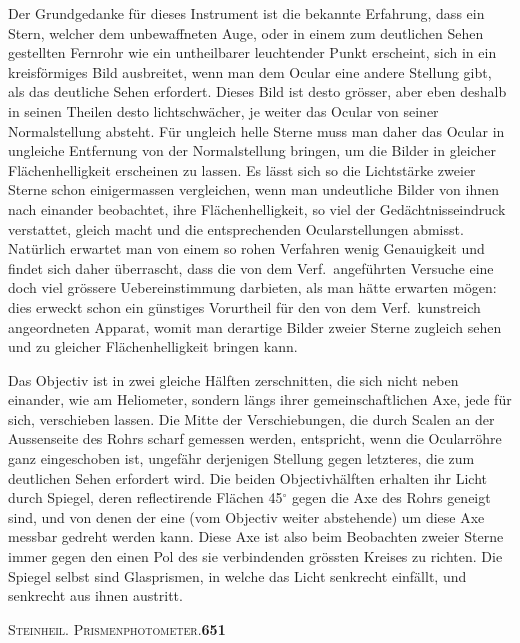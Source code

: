 \documentclass[12pt,a4paper]{article}
\begin{document}
Der Grundgedanke f\"ur dieses Instrument ist die bekannte Erfahrung, dass ein Stern, welcher dem unbewaffneten Auge, oder in einem zum deutlichen Sehen gestellten Fernrohr wie ein untheilbarer leuchtender Punkt erscheint, sich in ein kreisf\"ormiges Bild ausbreitet, wenn man dem Ocular eine andere Stellung gibt, als das deutliche Sehen erfordert. Dieses Bild ist desto gr\"osser, aber eben deshalb in seinen Theilen desto lichtschw\"acher, je weiter das Ocular von seiner Normalstellung absteht. F\"ur ungleich helle Sterne muss man daher das Ocular in ungleiche Entfernung von der Normalstellung bringen, um die Bilder in gleicher Fl\"achenhelligkeit erscheinen zu lassen. Es l\"asst sich so die Lichtst\"arke zweier Sterne schon einigermassen vergleichen, wenn man undeutliche Bilder von ihnen nach einander beobachtet, ihre Fl\"achenhelligkeit, so viel der Ged\"achtnisseindruck verstattet, gleich macht und die entsprechenden Ocularstellungen abmisst. Nat\"urlich erwartet man von einem so rohen Verfahren wenig Genauigkeit und findet sich daher \"uberrascht, dass die von dem Verf.\ angef\"uhrten Versuche eine doch viel gr\"ossere Uebereinstimmung darbieten, als man h\"atte erwarten m\"ogen: dies erweckt schon ein g\"unstiges Vorurtheil f\"ur den von dem Verf.\ kunstreich angeordneten Apparat, womit man derartige Bilder zweier Sterne zugleich sehen und zu gleicher Fl\"achenhelligkeit bringen kann.

Das Objectiv ist in zwei gleiche H\"alften zerschnitten, die sich nicht neben einander, wie am Heliometer, sondern l\"angs ihrer gemeinschaftlichen Axe, jede f\"ur sich, verschieben lassen. Die Mitte der Verschiebungen, die durch Scalen an der Aussenseite des Rohrs scharf gemessen werden, entspricht, wenn die Ocularr\"ohre ganz eingeschoben ist, ungef\"ahr derjenigen Stellung gegen letzteres, die zum deutlichen Sehen erfordert wird. Die beiden Objectivh\"alften erhalten ihr Licht durch Spiegel, deren reflectirende Fl\"achen 45$^{\circ}$ gegen die Axe des Rohrs geneigt sind, und von denen der eine (vom Objectiv weiter abstehende) um diese Axe messbar gedreht werden kann. Diese Axe ist also beim Beobachten zweier Sterne immer gegen den einen Pol des sie verbindenden gr\"ossten Kreises zu richten. Die Spiegel selbst sind Glasprismen, in welche das Licht senkrecht einf\"allt, und senkrecht aus ihnen austritt.

\begin{center}
\small\textsc{Steinheil. Prismenphotometer.}\quad\textbf{651}
\end{center}
\end{document}
